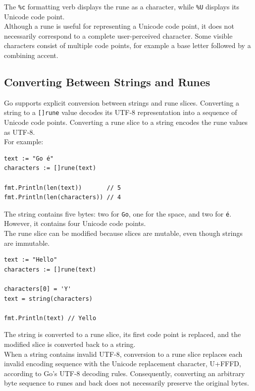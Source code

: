 The \texttt{\%c} formatting verb displays the rune as a character, while \texttt{\%U} displays its Unicode code point.\\

Although a rune is useful for representing a Unicode code point, it does not necessarily correspond to a complete user-perceived character. Some visible characters consist of multiple code points, for example a base letter followed by a combining accent.

\subsection{Converting Between Strings and Runes}

Go supports explicit conversion between strings and rune slices. Converting a string to a \texttt{[]rune} value decodes its UTF-8 representation into a sequence of Unicode code points. Converting a rune slice to a string encodes the rune values as UTF-8.\\

For example:

\begin{lstlisting}
text := "Go é"
characters := []rune(text)

fmt.Println(len(text))       // 5
fmt.Println(len(characters)) // 4
\end{lstlisting}

The string contains five bytes: two for \texttt{Go}, one for the space, and two for \texttt{é}. However, it contains four Unicode code points.\\

The rune slice can be modified because slices are mutable, even though strings are immutable.

\begin{lstlisting}
text := "Hello"
characters := []rune(text)

characters[0] = 'Y'
text = string(characters)

fmt.Println(text) // Yello
\end{lstlisting}

The string is converted to a rune slice, its first code point is replaced, and the modified slice is converted back to a string.\\

When a string contains invalid UTF-8, conversion to a rune slice replaces each invalid encoding sequence with the Unicode replacement character, U+FFFD, according to Go's UTF-8 decoding rules. Consequently, converting an arbitrary byte sequence to runes and back does not necessarily preserve the original bytes.

